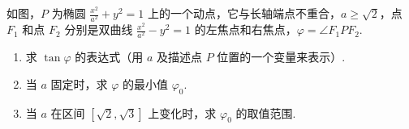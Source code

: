\begin{problem}
如图，\(P\) 为椭圆 \(\frac{x^2}{a^2} + y^2 = 1\) 上的一个动点，它与长轴端点不重合，\(a \geqslant \sqrt{2}\)，点 \(F_1\) 和点 \(F_2\) 分别是双曲线 \(\frac{x^2}{a^2} - y^2 = 1\) 的左焦点和右焦点，\(\varphi = \angle F_1PF_2\).

\begin{enumerate}
\item 求 \(\tan\varphi\) 的表达式（用 \(a\) 及描述点 \(P\) 位置的一个变量来表示）.
\item 当 \(a\) 固定时，求 \(\varphi\) 的最小值 \(\varphi_0\).
\item 当 \(a\) 在区间 \([\sqrt{2}, \sqrt{3}]\) 上变化时，求 \(\varphi_0\) 的取值范围.
\end{enumerate}

\end{problem}

